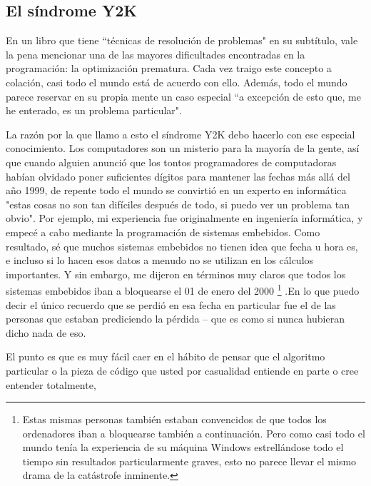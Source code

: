 \newpage


\subsection*{El síndrome Y2K}
\label{sec:y2k}

En un libro que tiene “técnicas de resolución de problemas" en su subtítulo, vale la pena mencionar una de las mayores dificultades encontradas en la programación: la optimización prematura. Cada vez traigo este concepto a colación, casi todo el mundo está de acuerdo con ello. Además, todo el mundo parece reservar en su propia mente un caso especial  “a excepción de esto que, me he enterado, es un problema particular". \newline

La razón por la que llamo a esto el síndrome Y2K debo hacerlo con ese especial conocimiento. Los computadores son un misterio para la mayoría de la gente, así que cuando alguien anunció que los tontos programadores de computadoras  habían olvidado poner suficientes dígitos para mantener las fechas más allá del año 1999, de repente todo el mundo se convirtió en un experto en informática \- "estas cosas no son tan difíciles después de todo, si puedo ver un problema tan obvio". Por ejemplo, mi experiencia fue originalmente en ingeniería informática, y empecé a cabo mediante la programación de sistemas embebidos. Como resultado, sé que muchos sistemas embebidos no tienen idea que fecha u hora es, e incluso si lo hacen esos datos a menudo no se utilizan en los cálculos importantes. Y sin embargo, me dijeron en términos muy claros que todos los sistemas embebidos iban a bloquearse el 01 de enero del 2000 \footnote{Estas mismas personas también estaban convencidos de que todos los ordenadores iban a bloquearse también a continuación. Pero como casi todo el mundo tenía la experiencia de su máquina Windows estrellándose todo el tiempo sin resultados particularmente graves, esto no parece llevar el mismo drama de la catástrofe inminente.} %
.En lo que puedo decir el único recuerdo que se perdió en esa fecha en particular fue el de las personas que estaban prediciendo la pérdida –  que es como si nunca hubieran dicho nada de eso.
\newline

El punto es que es muy fácil caer en el hábito de pensar que el algoritmo particular o la pieza de código que usted por casualidad entiende en parte o cree entender totalmente, %

